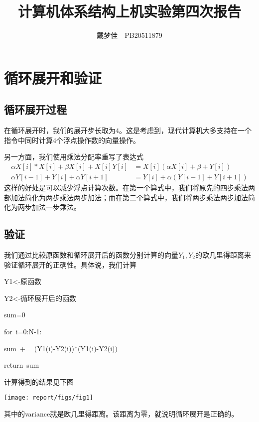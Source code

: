 \documentclass[english]{ctexart}
\newenvironment{lyxcode}
	{\par\begin{list}{}{
		\setlength{\rightmargin}{\leftmargin}
		\setlength{\listparindent}{0pt}%
		\raggedright
		\setlength{\itemsep}{0pt}
		\setlength{\parsep}{0pt}
		\normalfont\ttfamily}%
	 \item[]}
	{\end{list}}
\begin{document}
\title{计算机体系结构上机实验第四次报告}
\author{戴梦佳\ \ PB20511879}
\maketitle

\section{循环展开和验证}

\subsection{循环展开过程}

在循环展开时，我们的展开步长取为$4$。这是考虑到，现代计算机大多支持在一个指令中同时计算4个浮点操作数的向量操作。

另一方面，我们使用乘法分配率重写了表达式
\begin{equation}
\begin{aligned}\alpha X[i]*X[i]+\beta X[i]+X[i]Y[i] & =X[i](\alpha X[i]+\beta+Y[i])\\
\alpha Y[i-1]+Y[i]+\alpha Y[i+1] & =Y[i]+\alpha(Y[i-1]+Y[i+1])
\end{aligned}
\end{equation}
这样的好处是可以减少浮点计算次数。在第一个算式中，我们将原先的四步乘法两部加法简化为两步乘法两步加法；而在第二个算式中，我们将两步乘法两步加法简化为两步加法一步乘法。

\subsection{验证}

我们通过比较原函数和循环展开后的函数分别计算的向量$Y_{1},Y_{2}$的欧几里得距离来验证循环展开的正确性。具体说，我们计算
\begin{lyxcode}
Y1<-原函数

Y2<-循环展开后的函数

sum=0

for~i=0:N-1:
\begin{lyxcode}
sum~+=~(Y1(i)-Y2(i)){*}(Y1(i)-Y2(i))
\end{lyxcode}
return~sum
\end{lyxcode}
计算得到的结果见下图

\texttt{[image: report/figs/fig1]}

其中的variance就是欧几里得距离。该距离为零，就说明循环展开是正确的。
\end{document}
